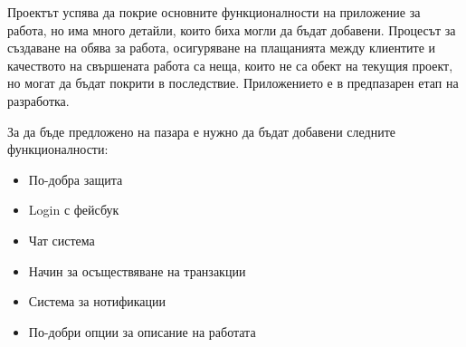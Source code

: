 Проектът успява да покрие основните функционалности на приложение за работа, но има много детайли, които биха могли да бъдат добавени. Процесът за създаване на обява за работа, осигуряване на плащанията между клиентите и качеството на свършената работа са неща, които не са обект на текущия проект, но могат да бъдат покрити в последствие. Приложението е в предпазарен етап на разработка.

За да бъде предложено на пазара е нужно да бъдат добавени следните функционалности:
\begin{itemize}
    \item По-добра защита
    \item Login с фейсбук
    \item Чат система
    \item Начин за осъществяване на транзакции
    \item Система за нотификации
    \item По-добри опции за описание на работата
\end{itemize}